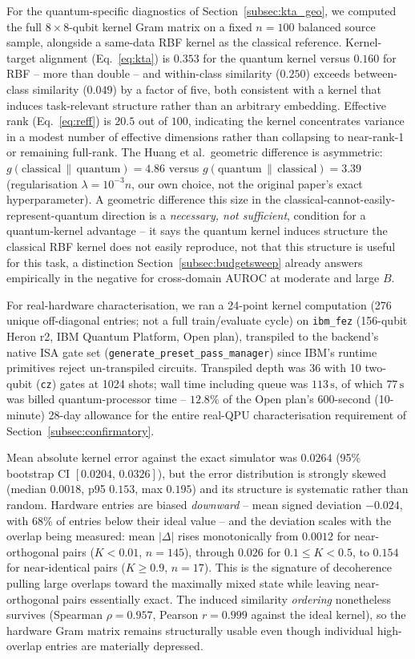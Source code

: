 \documentclass[conference]{IEEEtran}
\begin{document}
For the quantum-specific diagnostics of Section~\ref{subsec:kta_geo}, we
computed the full $8\times8$-qubit kernel Gram matrix on a fixed
$n{=}100$ balanced source sample, alongside a same-data RBF kernel as
the classical reference. Kernel-target alignment
(Eq.~\eqref{eq:kta}) is $0.353$ for the quantum kernel versus $0.160$ for
RBF -- more than double -- and within-class similarity ($0.250$) exceeds
between-class similarity ($0.049$) by a factor of five, both consistent
with a kernel that induces task-relevant structure rather than an
arbitrary embedding. Effective rank (Eq.~\eqref{eq:reff}) is
$20.5$ out of $100$, indicating the kernel concentrates variance in a
modest number of effective dimensions rather than collapsing to
near-rank-1 or remaining full-rank. The Huang et al.\ geometric
difference \cite{huang2021} is asymmetric: $g(\text{classical}\,\|\,
\text{quantum})=4.86$ versus $g(\text{quantum}\,\|\,\text{classical})=3.39$
(regularisation $\lambda=10^{-3}n$, our own choice, not the original
paper's exact hyperparameter). A geometric difference this size in the
classical-cannot-easily-represent-quantum direction is a
\emph{necessary, not sufficient}, condition for a quantum-kernel
advantage -- it says the quantum kernel induces structure the classical
RBF kernel does not easily reproduce, not that this structure is useful
for this task, a distinction Section~\ref{subsec:budgetsweep} already
answers empirically in the negative for cross-domain AUROC at moderate
and large $B$.

For real-hardware characterisation, we ran a 24-point kernel computation
(276 unique off-diagonal entries; not a full train/evaluate cycle) on
\texttt{ibm\_fez} (156-qubit Heron r2, IBM Quantum Platform, Open plan),
transpiled to the backend's native ISA gate set
(\texttt{generate\_preset\_pass\_manager}) since IBM's runtime primitives
reject un-transpiled circuits. Transpiled depth was 36 with 10 two-qubit
(\texttt{cz}) gates at 1024 shots; wall time including queue was
$113\,\text{s}$, of which $77\,\text{s}$ was billed quantum-processor
time -- $12.8\%$ of the Open plan's 600-second (10-minute) 28-day
allowance for the entire real-QPU characterisation requirement of
Section~\ref{subsec:confirmatory}.

Mean absolute kernel error against the exact simulator was $0.0264$
(95\% bootstrap CI $[0.0204,\,0.0326]$), but the error distribution is
strongly skewed (median $0.0018$, p95 $0.153$, max $0.195$) and its
structure is systematic rather than random. Hardware entries are biased
\emph{downward} -- mean signed deviation $-0.024$, with $68\%$ of entries
below their ideal value -- and the deviation scales with the overlap
being measured: mean $|\Delta|$ rises monotonically from $0.0012$ for
near-orthogonal pairs ($K<0.01$, $n{=}145$), through $0.026$ for
$0.1\le K<0.5$, to $0.154$ for near-identical pairs ($K\ge0.9$,
$n{=}17$). This is the signature of decoherence pulling large overlaps
toward the maximally mixed state while leaving near-orthogonal pairs
essentially exact. The induced similarity \emph{ordering} nonetheless
survives (Spearman $\rho=0.957$, Pearson $r=0.999$ against the ideal
kernel), so the hardware Gram matrix remains structurally usable even
though individual high-overlap entries are materially depressed.
\end{document}
